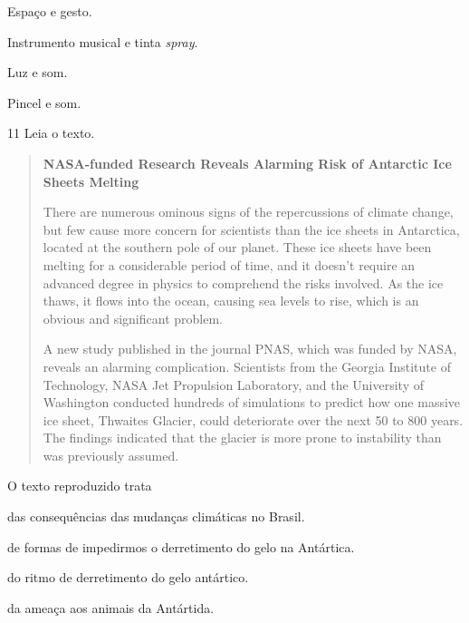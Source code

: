 \begin{escolha}
\item
  Espaço e gesto.
\item
  Instrumento musical e tinta \textit{spray}.
\item
  Luz e som.
\item
  Pincel e som.
\end{escolha}

\num{11} Leia o texto.

\begin{quote}
\textbf{NASA-funded Research Reveals Alarming Risk of Antarctic Ice
Sheets Melting}

There are numerous ominous signs of the repercussions of climate change,
but few cause more concern for scientists than the ice sheets in
Antarctica, located at the southern pole of our planet. These ice sheets
have been melting for a considerable period of time, and it doesn't
require an advanced degree in physics to comprehend the risks involved.
As the ice thaws, it flows into the ocean, causing sea levels to rise,
which is an obvious and significant problem.

A new study published in the journal PNAS, which was funded by NASA,
reveals an alarming complication. Scientists from the Georgia Institute
of Technology, NASA Jet Propulsion Laboratory, and the University of
Washington conducted hundreds of simulations to predict how one massive
ice sheet, Thwaites Glacier, could deteriorate over the next 50 to 800
years. The findings indicated that the glacier is more prone to
instability than was previously assumed.

\end{quote}

O texto reproduzido trata

\begin{escolha}
\item das consequências das mudanças climáticas no Brasil.

\item de formas de impedirmos o derretimento do gelo na Antártica.

\item do ritmo de derretimento do gelo antártico.

\item da ameaça aos animais da Antártida.
\end{escolha}

